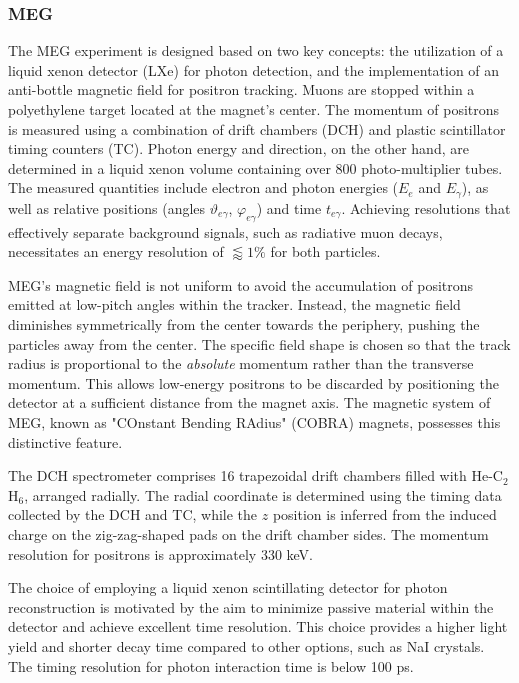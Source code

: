 \begin{refsection}
        \subsubsection{MEG}
        The MEG experiment \cite{MEG} is designed based on two key concepts: the utilization of a liquid xenon detector (LXe) for photon detection, and the implementation of an anti-bottle magnetic field for positron tracking. 
        Muons are stopped within a polyethylene target located at the magnet's center. 
        The momentum of positrons is measured using a combination of drift chambers (DCH) and plastic scintillator timing counters (TC). 
        Photon energy and direction, on the other hand, are determined in a liquid xenon volume containing over 800 photo-multiplier tubes. 
        The measured quantities include electron and photon energies ($E_e$ and $E_\gamma$), as well as relative positions (angles $\vartheta_{e\gamma}$, $\varphi_{e\gamma}$) and time $t_{e\gamma}$. 
        Achieving resolutions that effectively separate background signals, such as radiative muon decays, necessitates an energy resolution of $\lessapprox 1\%$ for both particles.

        MEG's magnetic field is not uniform to avoid the accumulation of positrons emitted at low-pitch angles within the tracker. 
        Instead, the magnetic field diminishes symmetrically from the center towards the periphery, pushing the particles away from the center. 
        The specific field shape is chosen so that the track radius is proportional to the \textit{absolute} momentum rather than the transverse momentum. 
        This allows low-energy positrons to be discarded by positioning the detector at a sufficient distance from the magnet axis. 
        The magnetic system of MEG, known as "COnstant Bending RAdius" (COBRA) magnets, possesses this distinctive feature.

        The DCH spectrometer comprises 16 trapezoidal drift chambers filled with He-C$_2$H$_6$, arranged radially. 
        The radial coordinate is determined using the timing data collected by the DCH and TC, while the $z$ position is inferred from the induced charge on the zig-zag-shaped pads on the drift chamber sides. The momentum resolution for positrons is approximately 330 keV.

        The choice of employing a liquid xenon scintillating detector for photon reconstruction is motivated by the aim to minimize passive material within the detector and achieve excellent time resolution. 
        This choice provides a higher light yield and shorter decay time compared to other options, such as NaI crystals. The timing resolution for photon interaction time is below 100 ps.


\end{refsection}
